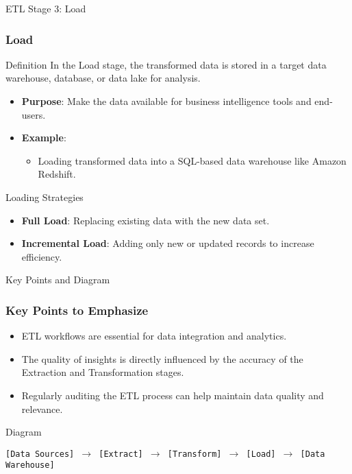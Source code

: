 \documentclass[aspectratio=169]{beamer}
\begin{document}
\begin{frame}[fragile]{ETL Stage 3: Load}
  \frametitle{Load}

  \begin{block}{Definition}
    In the Load stage, the transformed data is stored in a target data warehouse, database, or data lake for analysis.
  \end{block}

  \begin{itemize}
    \item \textbf{Purpose}: Make the data available for business intelligence tools and end-users.
    \item \textbf{Example}:
      \begin{itemize}
        \item Loading transformed data into a SQL-based data warehouse like Amazon Redshift.
      \end{itemize}
  \end{itemize}

  \begin{block}{Loading Strategies}
    \begin{itemize}
      \item \textbf{Full Load}: Replacing existing data with the new data set.
      \item \textbf{Incremental Load}: Adding only new or updated records to increase efficiency.
    \end{itemize}
  \end{block}
\end{frame}

\begin{frame}[fragile]{Key Points and Diagram}
  \frametitle{Key Points to Emphasize}

  \begin{itemize}
    \item ETL workflows are essential for data integration and analytics.
    \item The quality of insights is directly influenced by the accuracy of the Extraction and Transformation stages.
    \item Regularly auditing the ETL process can help maintain data quality and relevance.
  \end{itemize}

  \begin{block}{Diagram}
    \begin{center}
      \texttt{[Data Sources] $\rightarrow$ [Extract] $\rightarrow$ [Transform] $\rightarrow$ [Load] $\rightarrow$ [Data Warehouse]}
    \end{center}
  \end{block}
\end{frame}
\end{document}
